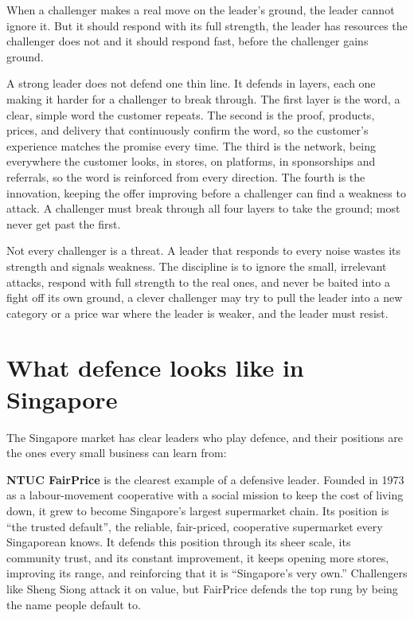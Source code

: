 \documentclass[10pt,twoside,openany]{memoir}
\newcommand{\needspacehead}{\needspace{4\baselineskip}}
\let\oldsection\section
\renewcommand{\section}{\needspacehead\oldsection}
\begin{document}
{When a challenger makes a real move on the leader's ground, the leader
cannot ignore it. But it should respond with its full strength, the
leader has resources the challenger does not and it should respond fast,
before the challenger gains ground.

A strong leader does not defend one thin line. It defends in layers,
each one making it harder for a challenger to break through. The first
layer is the word, a clear, simple word the customer repeats. The second
is the proof, products, prices, and delivery that continuously confirm
the word, so the customer's experience matches the promise every time.
The third is the network, being everywhere the customer looks, in
stores, on platforms, in sponsorships and referrals, so the word is
reinforced from every direction. The fourth is the innovation, keeping
the offer improving before a challenger can find a weakness to attack. A
challenger must break through all four layers to take the ground; most
never get past the first.

Not every challenger is a threat. A leader that responds to every noise
wastes its strength and signals weakness. The discipline is to ignore
the small, irrelevant attacks, respond with full strength to the real
ones, and never be baited into a fight off its own ground, a clever
challenger may try to pull the leader into a new category or a price war
where the leader is weaker, and the leader must resist.

\section{What defence looks like in
Singapore}\label{what-defence-looks-like-in-singapore}

The Singapore market has clear leaders who play defence, and their
positions are the ones every small business can learn from:

\textbf{NTUC FairPrice} is the clearest example of a defensive leader.
Founded in 1973 as a labour-movement cooperative with a social mission
to keep the cost of living down, it grew to become Singapore's largest
supermarket chain. Its position is ``the trusted default'', the
reliable, fair-priced, cooperative supermarket every Singaporean knows.
It defends this position through its sheer scale, its community trust,
and its constant improvement, it keeps opening more stores, improving
its range, and reinforcing that it is ``Singapore's very own.''
Challengers like Sheng Siong attack it on value, but FairPrice defends
the top rung by being the name people default to.

}
\end{document}
